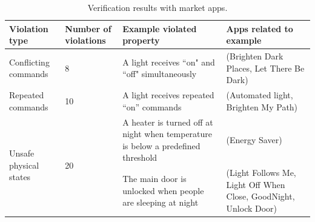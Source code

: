 \begin{table}[tb]
\scriptsize
\caption{Verification results with market apps.}
\label{market_apps}
\centering
{\begin{tabular}{| p{2.2cm} | p{1.4cm} | p{4.5cm} | p{4.5cm} |}
\hline
{\bf Violation type} & {\bf Number of violations} & {\bf Example violated property} & {\bf Apps related to example}\\
\hline
Conflicting commands & 8 & A light receives ``on" and ``off" simultaneously & (Brighten Dark Places, Let There Be Dark)\\
\hline
Repeated commands & 10 & A light receives repeated ``on'' commands & (Automated light, Brighten My Path)\\
\hline
\multirow{2}{2.2cm}{Unsafe physical states} & \multirow{2}{*}{20} & A heater is turned off at night when temperature is below a predefined threshold & (Energy Saver)\\ \cline{3-4}
 & & The main door is unlocked when people are sleeping at night & (Light Follows Me, Light Off When Close, GoodNight, Unlock Door)\\ \cline{3-4}
\hline
\end{tabular}}
\end{table}

